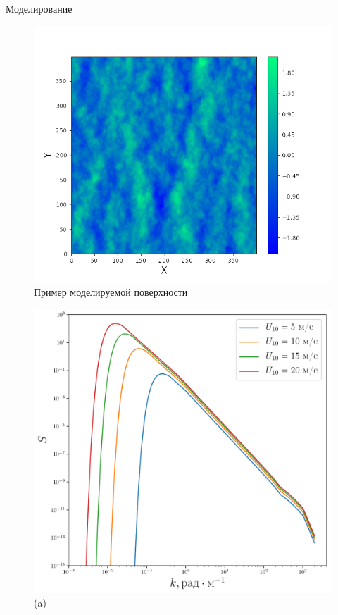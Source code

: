 \begin{frame}[t]{}
\begin{columns}[t]
\begin{column}{.48\linewidth}
\begin{block}{Моделирование}
        \begin{figure}[h]
            \centering
            \includegraphics[width=0.6\linewidth]{water10.png}
            \caption{Пример моделируемой поверхности}
            \label{fig:1}
        \end{figure}
        \begin{figure}[h]
            \begin{minipage}{0.32\linewidth}
                \includegraphics[width=\linewidth]{fig/full_spectrum1}
                \centering
                (a)
            \end{minipage}
            \begin{minipage}{0.32\linewidth}

\end{minipage}
\end{figure}
\end{block}
\end{column}
\end{columns}
\end{frame}
